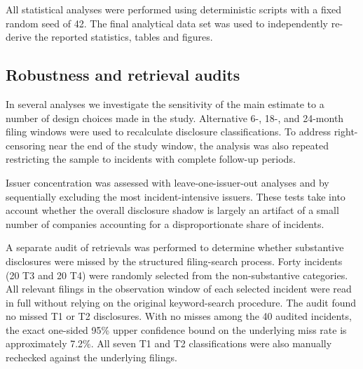\documentclass[utf8]{FrontiersinHarvard}
\providecommand{\DIFaddend}{} %
\begin{document}
\DIFaddend All statistical analyses were performed using deterministic scripts with a fixed random seed of 42. The final analytical data set was used to independently re-derive the reported statistics, tables and figures.

\subsection{Robustness and retrieval audits}
In several analyses we investigate the sensitivity of the main estimate to a number of design choices made in the study. Alternative 6-, 18-, and 24-month filing windows were used to recalculate disclosure classifications. To address right-censoring near the end of the study window, the analysis was also repeated restricting the sample to incidents with complete follow-up periods.

Issuer concentration was assessed with leave-one-issuer-out analyses and by sequentially excluding the most incident-intensive issuers. These tests take into account whether the overall disclosure shadow is largely an artifact of a small number of companies accounting for a disproportionate share of incidents.

A separate audit of retrievals was performed to determine whether substantive disclosures were missed by the structured filing-search process. Forty incidents (20 T3 and 20 T4) were randomly selected from the non-substantive categories. All relevant filings in the observation window of each selected incident were read in full without relying on the original keyword-search procedure. The audit found no missed T1 or T2 disclosures. With no misses among the 40 audited incidents, the exact one-sided 95\% upper confidence bound on the underlying miss rate is approximately 7.2\%. All seven T1 and T2 classifications were also manually rechecked against the underlying filings.
\end{document}
